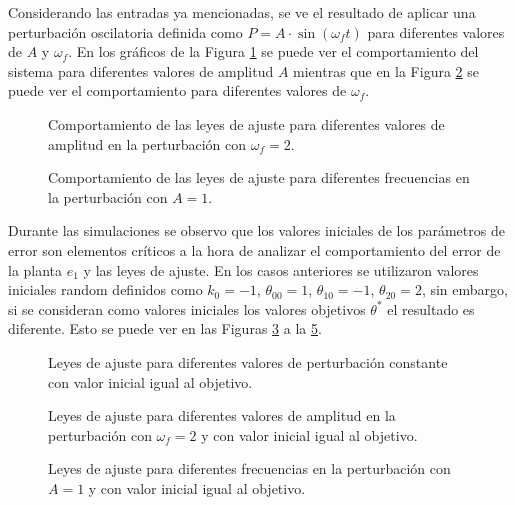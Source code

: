 \documentclass[letterpaper,11pt]{article} %
\begin{document}
Considerando las entradas ya mencionadas, se ve el resultado de aplicar una perturbación oscilatoria definida como $ P =A\cdot \sin(\omega_f t)$ para diferentes valores de $A$ y $\omega_f$. En los gráficos de la Figura \ref{estado2} se puede ver el comportamiento del sistema para diferentes valores de amplitud $A$ mientras que en la Figura \ref{estado3} se puede ver el comportamiento para diferentes valores de $\omega_f$.  
\newpage
\begin{figure}[h]
	\centering
	\captionsetup{justification=centering}
	\caption{Comportamiento de las leyes de ajuste para diferentes valores  de amplitud en la perturbación con $\omega_f=2$.}
	\label{estado2}
\end{figure}
\newpage
\begin{figure}[h]
	\centering
	\captionsetup{justification=centering}
	\caption{Comportamiento de las leyes de ajuste para diferentes frecuencias en la perturbación con $A = 1$.}
	\label{estado3}
\end{figure}
Durante las simulaciones se observo que los valores iniciales de los parámetros de error son elementos críticos a la hora de analizar el comportamiento del error de la planta $e_1$ y las leyes de ajuste. En los casos anteriores se utilizaron valores iniciales random definidos como $k_0=-1$, $\theta_{00} = 1$, $\theta_{10} = -1$, $\theta_{20} = 2$, sin embargo, si se consideran como valores iniciales los valores objetivos $\theta^*$ el resultado es diferente. Esto se puede ver en las Figuras \ref{estado4} a la \ref{estado6}. 
\newpage
\begin{figure}[h]
	\centering
	\captionsetup{justification=centering}
	\caption{Leyes de ajuste para diferentes valores de perturbación constante con valor inicial igual al objetivo.}
	\label{estado4}
\end{figure}
\newpage
\begin{figure}[h]
	\centering
	\captionsetup{justification=centering}
	\caption{Leyes de ajuste para diferentes valores de amplitud en la perturbación con $\omega_f=2$ y con valor inicial igual al objetivo.}
	\label{estado5}
\end{figure}
\newpage
\begin{figure}[h]
	\centering
	\captionsetup{justification=centering}
	\caption{Leyes de ajuste para diferentes frecuencias en la perturbación con $A = 1$ y  con valor inicial igual al objetivo.}
	\label{estado6}
\end{figure}
\end{document}
